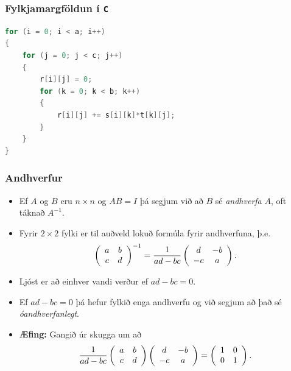 \documentclass{beamer}
\begin{document}
\begin{frame}[fragile]
	\frametitle{Fylkjamargföldun í \texttt{C}}
\begin{lstlisting}[language=C]
for (i = 0; i < a; i++)
{
	for (j = 0; j < c; j++)
	{
		r[i][j] = 0;
		for (k = 0; k < b; k++)
		{
			r[i][j] += s[i][k]*t[k][j];
		}
	}
}
\end{lstlisting}
\end{frame}

\begin{frame}
	\frametitle{Andhverfur}
	\begin{itemize}
		\item<1-> Ef $A$  og $B$ eru $n \times n$ og $AB = I$ þá segjum við að $B$ sé \emph{andhverfa} $A$, oft táknað $A^{-1}$.
		\item<2-> Fyrir $2 \times 2$ fylki er til auðveld lokuð formúla fyrir andhverfuna, þ.e.
			\[
				\left (
				\begin{array}{c c}
					a & b\\
					c & d
				\end{array}
				\right )^{-1}
				=
				\frac{1}{ad - bc}
				\left (
				\begin{array}{c c}
					d & -b\\
					-c & a
				\end{array}
				\right ).
			\]
		\item<3-> Ljóst er að einhver vandi verður ef $ad - bc = 0$.
		\item<4-> Ef $ad - bc = 0$ þá hefur fylkið enga andhverfu og við segjum að það sé \emph{óandhverfanlegt}.
		\item<5-> {\bf Æfing:} Gangið úr skugga um að
			\[
				\frac{1}{ad - bc}
				\left (
				\begin{array}{c c}
					a & b\\
					c & d
				\end{array}
				\right )
				\left (
				\begin{array}{c c}
					d & -b\\
					-c & a
				\end{array}
				\right )
				=
				\left (
				\begin{array}{c c}
					1 & 0\\
					0 & 1
				\end{array}
				\right ).
			\]
	\end{itemize}
\end{frame}
\end{document}
